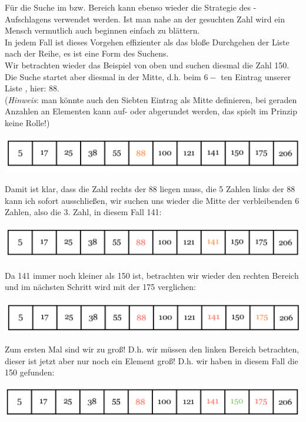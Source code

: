 \documentclass{article}
\begin{document}
Für die Suche im  bzw.  Bereich kann ebenso wieder die Strategie des - Aufschlagens verwendet werden. Ist man nahe an der gesuchten Zahl wird ein Mensch vermutlich auch beginnen einfach zu blättern.\\
In jedem Fall ist dieses Vorgehen effizienter als das bloße Durchgehen der Liste nach der Reihe, es ist eine  Form des Suchens. \\
Wir betrachten wieder das Beispiel von oben und suchen diesmal die Zahl 150. Die Suche startet aber diesmal in der Mitte,  d.h. beim $6-$ ten Eintrag unserer Liste , hier: 88. \\
(\textit{Hinweis}: man könnte auch den Siebten Eintrag als Mitte definieren, bei geraden Anzahlen an Elementen kann auf- oder abgerundet werden, das spielt im Prinzip keine Rolle!)
\begin{center}
    \includegraphics[scale=0.25]{../../media/search3.png}
\end{center}
Damit ist klar, dass die Zahl rechts der 88 liegen muss, die 5 Zahlen links der 88 kann ich sofort ausschließen, wir suchen uns wieder die Mitte der verbleibenden 6 Zahlen, also die 3. Zahl, in diesem Fall 141:
\begin{center}
    \includegraphics[scale=0.25]{../../media/search4.png}
\end{center}
Da 141 immer noch kleiner als 150 ist, betrachten wir wieder den rechten Bereich und im nächsten Schritt wird mit der 175 verglichen:
\begin{center}
    \includegraphics[scale=0.25]{../../media/search5.png}
\end{center}
Zum ersten Mal sind wir zu groß! D.h. wir müssen den linken Bereich betrachten, dieser ist jetzt aber nur noch ein Element groß! D.h. wir haben in diesem Fall die 150 gefunden:
\begin{center}
    \includegraphics[scale=0.25]{../../media/search6.png}
\end{center}
\end{document}

